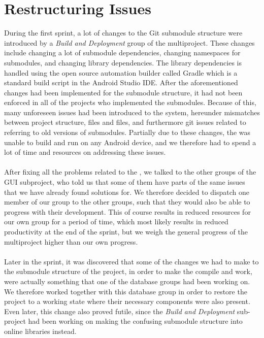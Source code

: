 \section{Restructuring Issues}
\label{sec:restructuring_issues}

During the first sprint, a lot of changes to the Git submodule structure were introduced by a \emph{Build and Deployment} group of the multiproject. These changes include changing a lot of submodule dependencies, changing namespaces for submodules, and changing library dependencies.  The library dependencies is handled using the open source automation builder called Gradle \parencite{gradle} which is a standard build script in the Android Studio IDE.  After the aforementioned changes had been implemented for the submodule structure, it had not been enforced in all of the \giraf projects who implemented the submodules. Because of this, many unforeseen issues had been introduced to the system, hereunder mismatches between project structure,  files and  files, and furthermore git issues related to referring to old versions of submodules. Partially due to these changes, the \ct was unable to build and run on any Android device, and we therefore had to spend a lot of time and resources on addressing these issues. 
\\\\
After fixing all the problems related to the \ct, we talked to the other groups of the GUI subproject, who told us that some of them have parts of the same issues that we have already found solutions for. We therefore decided to dispatch one member of our group to the other groups, such that they would also be able to progress with their development. This of course results in reduced resources for our own group for a period of time, which most likely results in reduced productivity at the end of the sprint, but we weigh the general progress of the multiproject higher than our own progress.
\\\\
Later in the sprint, it was discovered that some of the changes we had to make to the submodule structure of the project, in order to make the \ct compile and work, were actually something that one of the database groups had been working on. We therefore worked together with this database group in order to restore the project to a working state where their necessary components were also present. Even later, this change also proved futile, since the \emph{Build and Deployment} sub-project had been working on making the confusing submodule structure into online libraries instead. 

